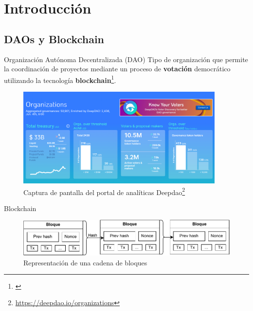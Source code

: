 \section{Introducción}

\subsection{DAOs y Blockchain}
\begin{frame}
    \begin{block}{Organización Autónoma Decentralizada (DAO)}
        Tipo de organización que permite la coordinación de proyectos mediante un proceso de \textbf{votación} democrático utilizando la tecnología \textbf{blockchain}\footnote{\textcite{hassan_decentralized_2021}}.
    \end{block}
\end{frame}

\begin{frame}
    \begin{figure}
        \centering
        \includegraphics[height=50mm]{images/screenshots/Screenshot_20240604_172208.png}
        \caption{Captura de pantalla del portal de analíticas Deepdao\footnote{\url{https://deepdao.io/organizations}}}
        \label{fig:enter-label}
    \end{figure}
\end{frame}

\begin{frame}{Blockchain}
    \begin{figure}
        \centering
        \includegraphics[width=\linewidth]{./images/diagrams/blockchain.drawio.pdf}
        \caption{Representación de una cadena de bloques}
    \end{figure}
\end{frame}

